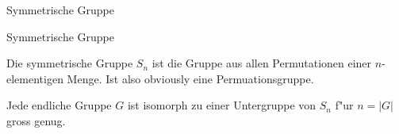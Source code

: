 \documentclass[class=article, crop=false]{standalone}
\begin{document}
\begin{zettel}{Symmetrische Gruppe}
\begin{flashcard}[ta5uyqfu]{Symmetrische Gruppe}
	\begin{definition}
		Die symmetrische Gruppe $S_n$ ist die Gruppe aus allen Permutationen einer $n$-elementigen Menge. Ist also obviously eine Permuationsgruppe.
	\end{definition}
\end{flashcard}

\begin{theorem}
	Jede endliche Gruppe $G$ ist isomorph zu einer Untergruppe von $S_n$ f"ur $n = |G|$ gross genug.
\end{theorem}
\end{zettel}
\end{document}
